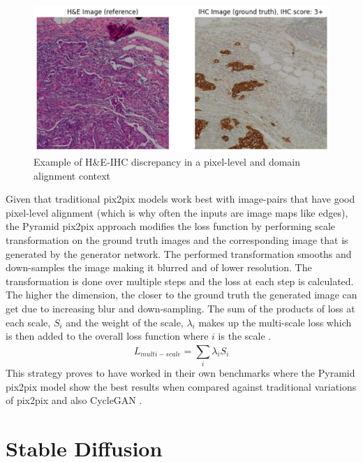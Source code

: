 \begin{figure}[h]
    \centering
    \includegraphics[width=1\linewidth]{2_LiteratureSurvey/figures/he-ihc-alignmentIssue.png}
    \caption{Example of H\&E-IHC discrepancy in a pixel-level and domain alignment context}
    \label{fig:he-ihc-alignment-issue-example}
\end{figure}
Given that traditional pix2pix models work best with image-pairs that have good pixel-level alignment (which is why often the inputs are image maps like edges), the Pyramid pix2pix approach modifies the loss function by performing scale transformation on the ground truth images and the corresponding image that is generated by the generator network. The performed transformation smooths and down-samples the image making it blurred and of lower resolution. The transformation is done over multiple steps and the loss at each step is calculated. The higher the dimension, the closer to the ground truth the generated image can get due to increasing blur and down-sampling. The sum of the products of  loss at each scale, $S_{i}$ and the weight of the scale, $\lambda_{i}$ makes up the multi-scale loss which is then added to the overall loss function where $i$ is the scale  \parencite[Equation 2, p. 6]{Liu2022BCI:Pix2pix}. 
\begin{equation}\label{eq:multi-scale-loss}
L_{multi−scale} = \sum_{i}^{} \lambda_{i}S_{i}
\end{equation}
This strategy proves to have worked in their own benchmarks where the Pyramid pix2pix model show the best results when compared against traditional variations of pix2pix and also CycleGAN \parencite[Table 1, p. 7]{Liu2022BCI:Pix2pix}.  

\section{Stable Diffusion}

